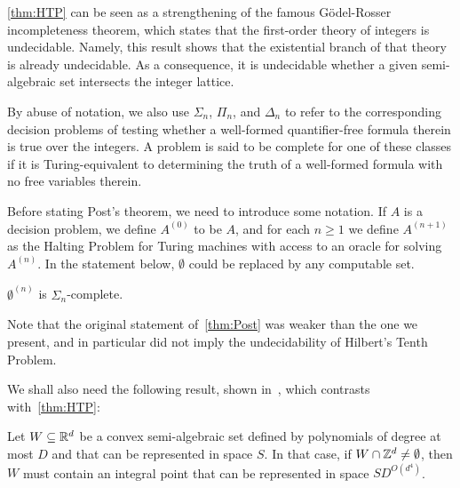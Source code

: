 \cref{thm:HTP} can be seen as a strengthening of the famous G\"{o}del-Rosser incompleteness theorem, which states that the first-order theory of integers is undecidable. Namely, this result shows that the existential branch of that theory is already undecidable. As a consequence, it is undecidable whether a given semi-algebraic set intersects the integer lattice.

By abuse of notation, we also use $\Sigma_{n}$, $\Pi_{n}$, and $\Delta_{n}$ to refer to the corresponding decision problems of testing whether a well-formed quantifier-free formula therein is true over the integers. A problem is said to be complete for one of these classes if it is Turing-equivalent to determining the truth of a well-formed formula with no free variables therein.

Before stating Post's theorem, we need to introduce some notation. If $A$ is a decision problem, we define $A^{(0)}$ to be $A$, and for each $n \geq 1$ we define $A^{(n+1)}$ as the Halting Problem for Turing machines with access to an oracle for solving $A^{(n)}$. In the statement below, $\emptyset$ could be replaced by any computable set.

\begin{theorem}
\label{thm:Post}
$\emptyset^{(n)}$ is $\Sigma_{n}$-complete.
\end{theorem}

Note that the original statement of~\cref{thm:Post} was weaker than the one we present, and in particular did not imply the undecidability of Hilbert's Tenth Problem.

We shall also need the following result, shown in~\cite{KhachiyanP97}, which contrasts with~\cref{thm:HTP}:
\begin{theorem}
\label{thm:kp}
Let $W\subseteq\mathbb{R}^{d}$ be a convex semi-algebraic set defined by
polynomials of degree at most $D$ and that can be represented in space
$S$. In that case, if $W\cap\mathbb{Z}^{d}\neq\emptyset$, then $W$ must
contain an integral point that can be represented in space
$SD^{O(d^4)}$.
\end{theorem}
